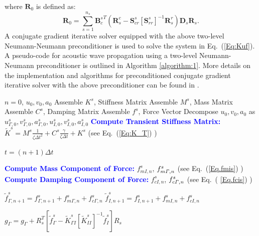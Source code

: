 \documentclass{article}
\begin{document}
where $\mathbf{R}_0$ is defined as:
\begin{equation}
\mathbf{R}_0 = \sum_{s=1}^{n_s} {\mathbf{B}_c^s}^T ({\mathbf{R}_s^c} - \mathbf{S}_{cr}^s [\mathbf{S}^s_{rr}]^{-1} \mathbf{R}_s^r) \mathbf{D}_s \mathbf{R}_s.
\end{equation}
A conjugate gradient iterative solver equipped with the above two-level Neumann-Neumann preconditioner is used to solve the system in Eq.~(\ref{Eq:Kuf}).
A pseudo-code for acoustic wave propagation using a two-level Neumann-Neumann preconditioner is outlined in Algorithm \ref{algorithm:1}. More details on the implementation and algorithms for preconditioned conjugate gradient iterative solver with the above preconditioner can be found in \cite{subber_thesis, ajit_thesis, ajit_CMAM}.

\begin{algorithm}
\caption{: \textcolor{blue}{Pseudo Code for Acoustic Wave Propagation in a Deterministic Medium}}
\label{algorithm:1}
\begin{algorithmic}[1]
  $n =0$, $u_0, v_0, a_0$
\State Assemble $K^s$, Stiffness Matrix  
\State Assemble $M^s$, Mass Matrix 
\State Assemble $C^s$, Damping Matrix 
\State Assemble $f^s$, Force Vector
\State Decompose $u_0, v_0, a_0 $  as $u_{\Gamma,0}^{s},v_{\Gamma,0}^{s},a_{\Gamma,0}^{s},u_{I,0}^{s},v_{I,0}^{s},a_{I,0}^{s}$
\State \textcolor{blue}{\bf{Compute Transient Stiffness Matrix:}}   $\tilde{K}^s = M ^s\frac{1}{\zeta \Delta t^2} + C^s \frac{\gamma}{\zeta \Delta t} + K^s $ (see Eq.~(\ref{Eq:K_T}) )
\EndFor \vspace{2 mm}
 
 \State $t = (n+1) \Delta t$
 
  
  \State \textcolor{blue}{{\bf{Compute Mass Component of Force:}}}  $f_{mI,n}^s$, $f_{m\it{\Gamma},n}^s$ (see Eq.~(\ref{Eq.fmis}) )
  \State \textcolor{blue}{{\bf{Compute Damping Component of Force:}}}  $f_{cI,n}^s$, $f_{c\it{\Gamma},n}^s$ (see Eq.~( \ref{Eq.fcis}) )
  
  \State $\tilde{f}_{\Gamma,n+1} ^{s} = f^s _{\Gamma,n+1} + f_{m\Gamma,n} ^{s}+ f_{c\Gamma,n} ^{s} $\;
  \State $\tilde{f}_{I,n+1} ^{s} = f^{s} _{I,n+1} + f_{mI,n} ^{s}+ f_{cI,n} ^{s} $\;
 
 \State $ g_\Gamma = g_\Gamma + R_s ^T [\tilde{f} ^s _{\Gamma} - \tilde{K} ^s _{\Gamma I}[\tilde{K} ^s _{II}]^{-1} \tilde{f} ^s _{I}] R_s $
 

\end{algorithmic}
\end{algorithm}
\end{document}
